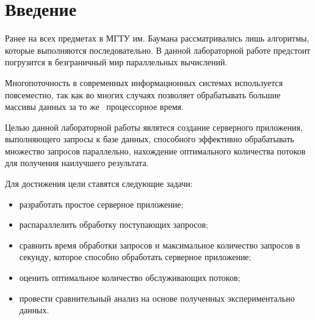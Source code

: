 \chapter*{Введение}

Ранее на всех предметах в МГТУ им. Баумана рассматривались лишь алгоритмы,
которые выполняются последовательно. В данной лабораторной работе предстоит
погрузится в безграничный мир параллельных вычислений.

Многопоточность в современных информационных системах используется повсеместно,
так как во многих случаях позволяет обрабатывать большие массивы данных
за то же  процессорное время.

Целью данной лабораторной работы являтеся создание серверного приложения, выполняющего запросы к базе данных, способного эффективно обрабатывать множество запросов параллельно, нахождение оптимального количества потоков для получения наилучшего результата.

Для достижения цели ставятся следующие задачи:
\begin{itemize}
	\item разработать простое серверное приложение;
	\item распараллелить обработку поступающих запросов;
	\item сравнить время обработки запросов и максимальное количество запросов в секунду, которое способно обработать серверное приложение;
	\item оценить оптимальное количество обслуживающих потоков;
	\item провести сравнительный анализ на основе полученных экспериментально данных.
\end{itemize}
